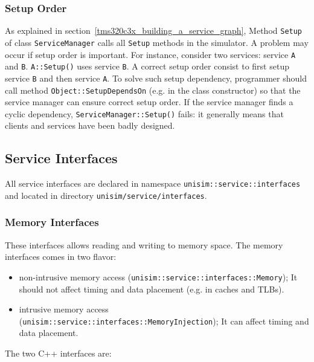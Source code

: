 \subsubsection{Setup Order}

As explained in section~\ref{tms320c3x_building_a_service_graph}, Method \texttt{Setup} of class \texttt{ServiceManager} calls all \texttt{Setup} methods in the simulator. A problem may occur if setup order is important. For instance, consider two services: service \texttt{A} and \texttt{B}. \texttt{A::Setup()} uses service \texttt{B}. A correct setup order consist to first setup service \texttt{B} and then service \texttt{A}.
To solve such setup dependency, programmer should call method \texttt{Object::SetupDependsOn} (e.g. in the class constructor) so that the service manager can ensure correct setup order.
If the service manager finds a cyclic dependency, \texttt{ServiceManager::Setup()} fails: it generally means that clients and services have been badly designed.

\newpage
\subsection{Service Interfaces}
\label{tms320c3x_interfaces}

All service interfaces are declared in namespace \texttt{unisim::service::interfaces} and located in directory \texttt{unisim/service/interfaces}.

\subsubsection{Memory Interfaces}

These interfaces allows reading and writing to memory space. The memory interfaces comes in two flavor:
\begin{itemize}
\item non-intrusive memory access (\texttt{unisim::service::interfaces::Memory}); It should not affect timing and data placement (e.g. in caches and TLBs).
\item intrusive memory access (\texttt{unisim::service::interfaces::MemoryInjection}); It can affect timing and data placement.
\end{itemize}

\noindent The two C++ interfaces are:

\begin{center}
	
\end{center}

